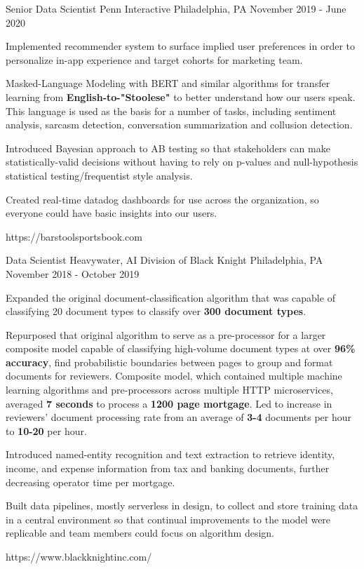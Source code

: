 \begin{cventries}
	\cventrylink
	{Senior Data Scientist}
	{Penn Interactive}
	{Philadelphia, PA}
	{November 2019 - June 2020}
	{ %
		\begin{cvitems}
			\item{Implemented recommender system to surface implied user preferences in order to personalize in-app experience and target cohorts for marketing team.}
			\item{Masked-Language Modeling with BERT and similar algorithms for transfer learning from \textbf{English-to-"Stoolese"} to better understand how our users speak. This language is used as the basis for a number of tasks, including sentiment analysis, sarcasm detection, conversation summarization and collusion detection.}
			\item{Introduced Bayesian approach to AB testing so that stakeholders can make statistically-valid decisions without having to rely on p-values and null-hypothesis statistical testing/frequentist style analysis.}
			\item{Created real-time datadog dashboards for use across the organization, so everyone could have basic insights into our users.}
		\end{cvitems}
	}
	{https://barstoolsportsbook.com}


	\cventrylink
	{Data Scientist}
	{Heavywater, AI Division of Black Knight}
	{Philadelphia, PA}
	{November 2018 - October 2019} %
	{ %
		\begin{cvitems}
			\item{Expanded the original document-classification algorithm that was capable of classifying 20 document types to classify over \textbf{300 document types}.}
			\item{Repurposed that original algorithm to serve as a pre-processor for a larger composite model capable of classifying high-volume document types at over \textbf{96\% accuracy}, find probabilistic boundaries between pages to group and format documents for reviewers. Composite model, which contained multiple machine learning algorithms and pre-processors across multiple HTTP microservices, averaged \textbf{7 seconds} to process a \textbf{1200 page mortgage}. Led to increase in reviewers' document processing rate from an average of \textbf{3-4} documents per hour to \textbf{10-20} per hour.}
			\item{Introduced named-entity recognition and text extraction to retrieve identity, income, and expense information from tax and banking documents, further decreasing operator time per mortgage.}
			\item{Built data pipelines, mostly serverless in design, to collect and store training data in a central environment so that continual improvements to the model were replicable and team members could focus on algorithm design.}
		\end{cvitems}
	}
	{https://www.blackknightinc.com/}


\end{cventries}
